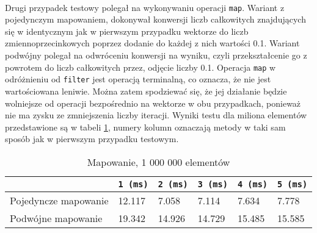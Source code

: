\documentclass[a4paper,10pt]{report}
\begin{document}
\paragraph{}
Drugi przypadek testowy polegał na wykonywaniu operacji \verb|map|. Wariant z pojedynczym mapowaniem, dokonywał konwersji liczb całkowitych znajdujących się w identycznym jak w pierwszym przypadku wektorze do liczb zmiennoprzecinkowych poprzez dodanie do każdej z nich wartości 0.1. Wariant podwójny polegał na odwróceniu konwersji na wyniku, czyli przekształcenie go z powrotem do liczb całkowitych przez, odjęcie liczby 0.1. Operacja \verb|map| w odróżnieniu od \verb|filter| jest operacją terminalną, co oznacza, że nie jest wartościowana leniwie. Można zatem spodziewać się, że jej działanie będzie wolniejsze od operacji bezpośrednio na wektorze w obu przypadkach, ponieważ nie ma zysku ze zmniejszenia liczby iteracji. Wyniki testu dla miliona elementów przedstawione są w tabeli \ref{tab3}, numery kolumn oznaczają metody w taki sam sposób jak w pierwszym przypadku testowym.
\begin{table}[t]
	\caption{Mapowanie, 1 000 000 elementów}
	\label{tab3}
	\begin{tabular}{|l|l|l|l|l|l|}
		\hline 
		& \verb|1 (ms)| & \verb|2 (ms)| & \verb|3 (ms)| & \verb|4 (ms)| & \verb|5 (ms)|\\
		\hline
		Pojedyncze mapowanie & 12.117 & 7.058 & 7.114 & 7.634 & 7.778 \\
		\hline
		Podwójne mapowanie & 19.342 & 14.926 & 14.729 & 15.485 & 15.585 \\
		\hline
	\end{tabular} 
\end{table}
\end{document}
